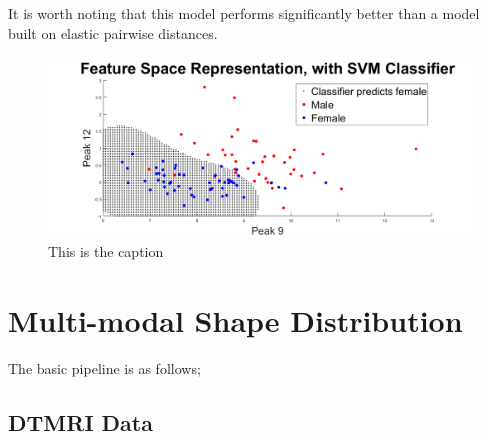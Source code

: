 \documentclass[]{article}
\begin{document}
It is worth noting that this model performs significantly better than a model built on elastic pairwise distances.   

\begin{center}
	\begin{figure}[h!]
		\includegraphics[width = \linewidth]{./Feature Space.png}
		\caption{This is the caption}
		\label{EX1: classifier plot}
	\end{figure}
\end{center}


\newpage

\section{Multi-modal Shape Distribution}

The basic pipeline is as follows;\\


\subsection{DTMRI Data}\label{DTMRI}
\end{document}
